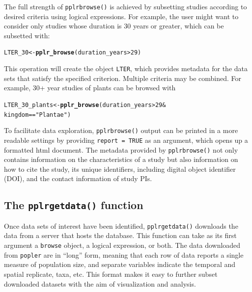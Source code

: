 \documentclass{article}\usepackage[]{graphicx}\usepackage[]{color}
\makeatletter
\newcommand{\hlnum}[1]{\textcolor[rgb]{0.686,0.059,0.569}{#1}}%
\newcommand{\hlstr}[1]{\textcolor[rgb]{0.192,0.494,0.8}{#1}}%
\newcommand{\hlopt}[1]{\textcolor[rgb]{0,0,0}{#1}}%
\newcommand{\hlstd}[1]{\textcolor[rgb]{0.345,0.345,0.345}{#1}}%
\newcommand{\hlkwb}[1]{\textcolor[rgb]{0.69,0.353,0.396}{#1}}%
\newcommand{\hlkwd}[1]{\textcolor[rgb]{0.737,0.353,0.396}{\textbf{#1}}}%
\newenvironment{kframe}{%
 \def\at@end@of@kframe{}%
 \ifinner\ifhmode%
  \def\at@end@of@kframe{\end{minipage}}%
  \begin{minipage}{\columnwidth}%
 \fi\fi%
 \def\FrameCommand##1{\hskip\@totalleftmargin \hskip-\fboxsep
 \colorbox{shadecolor}{##1}\hskip-\fboxsep
     \hskip-\linewidth \hskip-\@totalleftmargin \hskip\columnwidth}%
 \MakeFramed {\advance\hsize-\width
   \@totalleftmargin\z@ \linewidth\hsize
   \@setminipage}}%
 {\par\unskip\endMakeFramed%
 \at@end@of@kframe}
\newenvironment{knitrout}{}{} %
\makeatother
\begin{document}
The full strength of \texttt{pplr\textunderscore browse()} is achieved by subsetting studies according to desired criteria using logical expressions. For example, the user might want to consider only studies whose duration is 30 years or greater, which can be subsetted with:
\begin{knitrout}
\color{fgcolor}\begin{kframe}
\begin{alltt}
\hlstd{LTER_30} \hlkwb{<-} \hlkwd{pplr_browse}\hlstd{( duration_years} \hlopt{>} \hlnum{29}\hlstd{)}
\end{alltt}
\end{kframe}
\end{knitrout}
This operation will create the object \texttt{LTER}, which provides metadata for the data sets that satisfy the specified criterion. Multiple criteria may be combined. For example, 30+ year studies of plants can be browsed with
\begin{knitrout}
\color{fgcolor}\begin{kframe}
\begin{alltt}
\hlstd{LTER_30_plants} \hlkwb{<-} \hlkwd{pplr_browse}\hlstd{( duration_years} \hlopt{>} \hlnum{29} \hlopt{&}
                               \hlstd{kingdom} \hlopt{==} \hlstr{"Plantae"}\hlstd{)}
\end{alltt}
\end{kframe}
\end{knitrout}
To facilitate data exploration, \texttt{pplr\textunderscore browse()} output can be printed in a more readable settings by providing \texttt{report = TRUE} as an argument, which opens up a formatted html document. The metadata provided by \texttt{pplr\textunderscore browse()} not only contains information on the characteristics of a study but also information on how to cite the study, its unique identifiers, including digital object identifier (DOI), and the contact information of study PIs. 


\subsection*{The \texttt{pplr\textunderscore get\textunderscore data()} function}

Once data sets of interest have been identified, \texttt{pplr\textunderscore get\textunderscore data()} downloads the data from a server that hosts the database. This function can take as its first argument a \texttt{browse} object, a logical expression, or both. The data downloaded from \texttt{popler} are in ``long'' form, meaning that each row of data reports a single measure of population size, and separate variables indicate the temporal and spatial replicate, taxa, etc. This format makes it easy to further subset downloaded datasets with the aim of visualization and analysis. 
\end{document}
